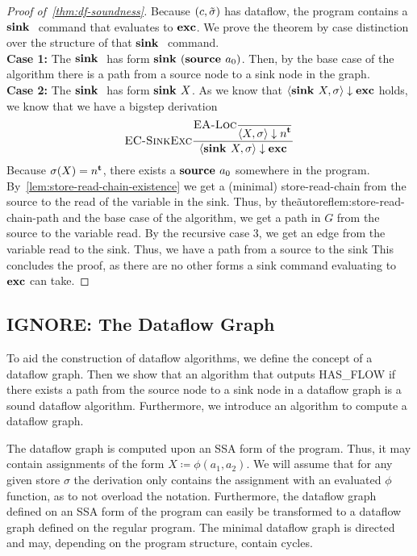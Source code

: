 \begin{proof}[Proof of~\autoref{thm:df-soundness}]
    Because $(c, \tilde{\sigma}{})$ has dataflow, the program contains a $\textbf{sink }{}$
    command that evaluates to $\textbf{exc}$.
    We prove the theorem by case distinction over the structure of that $\textbf{sink }{}$
    command.\\
    \textbf{Case 1:}
    The $\textbf{sink }{}$ has form $\textbf{sink }{(\textbf{source }{ a_0})}$.
    Then, by the base case of the algorithm there is a path from a source node
    to a sink node in the graph.\\
    \textbf{Case 2:}
    The $\textbf{sink }{}$ has form $\textbf{sink }{X}$.
    As we know that $\langle \textbf{sink }{X}, \sigma \rangle \downarrow \textbf{exc}$ holds, we know that
    we have a bigstep derivation
    \begin{align*}
        \textsc{EC-SinkExc}\frac{\displaystyle \textsc{EA-Loc}\frac{\displaystyle }{\displaystyle \langle X, \sigma \rangle \downarrow n^\textbf{t}{}}}{\displaystyle \langle \textbf{sink }{X}, \sigma \rangle \downarrow \textbf{exc}}
    \end{align*}
    Because $\sigma(X) = n^\textbf{t}{}$, there exists a $\textbf{source }{a_0}$ somewhere in the program.
    By~\autoref{lem:store-read-chain-existence} we get a (minimal) store-read-chain from the source 
    to the read of the variable in the sink.
    Thus, by the\~autoref{lem:store-read-chain-path} and the base case of the algorithm, 
    we get a path in $G$ from the source to the variable read.
    By the recursive case 3, we get an edge from the variable read to the sink.
    Thus, we have a path from a source to the sink
    This concludes the proof, as there are no other forms a sink command evaluating 
    to $\textbf{exc}$ can take.
\end{proof}
\iffalse
\subsection{IGNORE: The Dataflow Graph}
To aid the construction of dataflow algorithms, we define the concept
of a dataflow graph.
Then we show that an algorithm that outputs HAS\_FLOW if 
there exists a path from the source 
node to a sink node in a dataflow graph %
is a sound dataflow algorithm.
Furthermore, we introduce an algorithm to compute a dataflow graph.

The dataflow graph is computed upon an SSA form of the program.
Thus, it may contain assignments of the form $X \coloneqq \phi(a_1, a_2)$.
We will assume that for any given store $\sigma$ the derivation only contains 
the assignment with an evaluated $\phi$ function, as to not overload the notation.
Furthermore, the dataflow graph defined on an SSA form of the program can easily 
be transformed to a dataflow graph defined on the regular program.
The minimal dataflow graph is directed and may, depending on the 
program structure, contain cycles.

